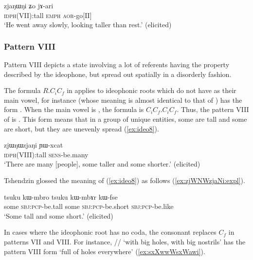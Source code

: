   \begin{exe} 
\ex  \label{ex:ideo7}
\gll  zjaŋɯŋi ʑo jɤ-ari   \\
\textsc{idph}(VII):tall  \textsc{emph} \textsc{aor}-go[II] \\
\glt `He went away slowly, looking taller than rest.'  (elicited)
 \end{exe}
 
  \subsubsection{Pattern VIII} \label{sec:ideo.VIII}
 Pattern VIII  depicts a state involving a lot of referents having the property described by the ideophone, but spread out spatially in a disorderly fashion. 

The formula $R$.$C_i$$C_f$ in  applies to ideophonic roots  which do  not have  as their main vowel, for instance  (whose meaning is almost identical to that of ) has the form . When the main vowel is , the formula is $C_i$$C_f$.$C_i$$C_f$. Thus, the pattern VIII of   is . This form means that in a group of unique entities, some are tall and some are short, but  they are unevenly spread (\ref{ex:ideo8}).
	
\begin{exe} 
\ex  \label{ex:ideo8}
\gll  zjɯŋɯzjaŋi ɲɯ-xcat \\
\textsc{idph}(VIII):tall \textsc{sens}-be.many \\
\glt `There are many [people], some taller and some shorter.'   (elicited)
  \end{exe}
	 
 Tshendzin glossed the meaning of (\ref{ex:ideo8}) as follows (\ref{ex:zjWNWzjaNi:expl}).
 
 \begin{exe} 
\ex  \label{ex:zjWNWzjaNi:expl}
\gll  tsuku kɯ-mbro tsuku kɯ-mbɤr kɯ-fse   \\
 some \textsc{sbj}:\textsc{pcp}-be.tall some \textsc{sbj}:\textsc{pcp}-be.short \textsc{sbj}:\textsc{pcp}-be.like \\
 \glt `Some tall and some short.'    (elicited)
  \end{exe}  

  In cases where the ideophonic root has no coda, the consonant  replaces $C_f$ in patterns VII and VIII. For instance, // `with big holes, with big nostrils' has the pattern VIII form  `full of holes everywhere' (\ref{ex:sxXwwWsxWawi}).

